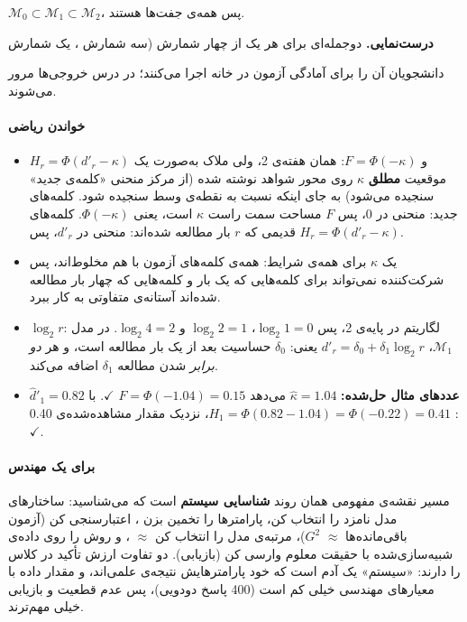 \(\mathcal{M}_0 \subset \mathcal{M}_1 \subset \mathcal{M}_2\)، پس همه‌ی
جفت‌ها  هستند.

\textbf{درست‌نمایی.} دوجمله‌ای برای هر یک از چهار شمارش (سه شمارش
، یک شمارش 

دانشجویان آن را برای آمادگی آزمون در خانه اجرا می‌کنند؛ در درس خروجی‌ها
مرور می‌شوند.

\paragraph{خواندن ریاضی}

\begin{itemize}
\tightlist
\item
  \(H_r = \Phi(d'_r - \kappa)\) و \(F = \Phi(-\kappa)\): همان 
  هفته‌ی 2، ولی ملاک به‌صورت یک موقعیت \textbf{مطلق} \(\kappa\) روی محور
  شواهد نوشته شده (از مرکز منحنی «کلمه‌ی جدید» سنجیده می‌شود) به جای اینکه
  نسبت به نقطه‌ی وسط سنجیده شود. کلمه‌های جدید: منحنی در 0، پس \(F\) مساحت
  سمت راست \(\kappa\) است، یعنی \(\Phi(-\kappa)\). کلمه‌های قدیمی که
  \(r\) بار مطالعه شده‌اند: منحنی در \(d'_r\)، پس
  \(H_r = \Phi(d'_r - \kappa)\).
\item
  یک \(\kappa\) برای همه‌ی شرایط: همه‌ی کلمه‌های آزمون با هم مخلوط‌اند، پس
  شرکت‌کننده نمی‌تواند برای کلمه‌هایی که یک بار و کلمه‌هایی که چهار بار
  مطالعه شده‌اند آستانه‌ی متفاوتی به کار ببرد.
\item
  \(\log_2 r\): لگاریتم در پایه‌ی 2، پس \(\log_2 1 = 0\)،
  \(\log_2 2 = 1\) و \(\log_2 4 = 2\). در مدل \(\mathcal{M}_1\)،
  \(d'_r = \delta_0 + \delta_1\log_2 r\) یعنی: \(\delta_0\) حساسیت بعد
  از یک بار مطالعه است، و هر \emph{دو برابر} شدن مطالعه \(\delta_1\)
  اضافه می‌کند.
\item
  \textbf{عددهای مثال حل‌شده:} \(\hat\kappa = 1.04\) می‌دهد
  \(F = \Phi(-1.04) = 0.15\) \ensuremath{\checkmark}. با \(\hat d'_1 = 0.82\):
  \(H_1 = \Phi(0.82 - 1.04) = \Phi(-0.22) = 0.41\)، نزدیک مقدار
  مشاهده‌شده‌ی 0.40 \ensuremath{\checkmark}.
\end{itemize}

\paragraph{برای یک مهندس}

مسیر نقشه‌ی مفهومی همان روند \textbf{شناسایی سیستم } است که می‌شناسید: ساختارهای مدل نامزد را انتخاب کن،
پارامترها را تخمین بزن ، اعتبارسنجی کن (آزمون باقی‌مانده‌ها \ensuremath{\approx}
\(G^2\))، مرتبه‌ی مدل را انتخاب کن  \ensuremath{\approx}
، و روش را روی داده‌ی شبیه‌سازی‌شده با حقیقت معلوم وارسی
کن (بازیابی). دو تفاوت ارزش تأکید در کلاس را دارند: «سیستم» یک آدم است
که خود پارامترهایش نتیجه‌ی علمی‌اند، و مقدار داده با معیارهای مهندسی خیلی
کم است (400 پاسخ دودویی)، پس عدم قطعیت و بازیابی خیلی مهم‌ترند.

